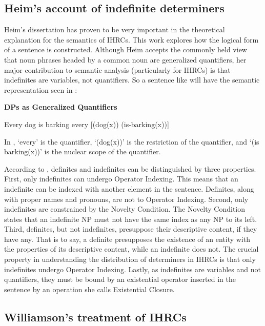 \documentclass[output=paper]{LSP/langsci}
\begin{document}
\subsection{Heim's account of indefinite determiners}\label{sec:boyle:6.1}

Heim's \citeyear{Heim1982} dissertation has proven to be very important in the theoretical explanation for the semantics of IHRCs. This work explores how the logical form of a sentence is constructed. Although Heim accepts the commonly held view that noun phrases headed by a common noun are generalized quantifiers, her major contribution to semantic analysis (particularly for IHRCs) is that indefinites are variables, not quantifiers.  So a sentence like  will have the semantic representation seen in :

\ea \textbf{DPs as Generalized Quantifiers}
\begin{xlist}
\ex Every dog is barking \label{boyle39a}
\ex every [(dog(x)) (is-barking(x))] \label{boyle39b}
\end{xlist}
\z

In , `every' is the quantifier, `(dog(x))' is the restriction of the quantifier, and `(is barking(x))' is the nuclear scope of the quantifier.  

According to \citet{Heim1982}, definites and indefinites can be distinguished by three properties. First, only indefinites can undergo Operator Indexing. This means that an indefinite can be indexed with another element in the sentence. Definites, along with proper names and pronouns, are not  to Operator Indexing. Second, only indefinites are constrained by the Novelty Condition. The Novelty Condition states that an indefinite NP must not have the same index as any NP to its left. Third, definites, but not indefinites, presuppose their descriptive content, if they have any.  That is to say, a definite presupposes the existence of an entity with the properties of its descriptive content, while an indefinite does not. The crucial property in understanding the distribution of determiners in IHRCs is that only indefinites undergo Operator Indexing. Lastly, as indefinites are variables and not quantifiers, they must be bound by an existential operator inserted in the sentence by an operation she calls Existential Closure.

\subsection{Williamson's treatment of IHRCs}\label{sec:boyle:6.2}
\end{document}

